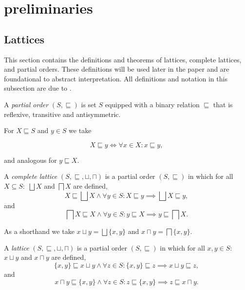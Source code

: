 
\section{preliminaries}\label{sec:preliminaries}

\subsection{Lattices}\label{subsec:lattices}
This section contains the definitions and theorems of lattices, complete lattices, and partial orders.
These definitions will be used later in the paper and are foundational to abstract interpretation.
All definitions and notation in this subsection are due to \cite{nielson_formal_2019}.

\begin{definition}
    A \emph{partial order} $(S, \sqsubseteq)$ is set $S$ equipped with a binary relation $\sqsubseteq$ that is reflexive, transitive and antisymmetric.
\end{definition}


For $X \sqsubseteq S$ and $y \in S$ we take


\begin{equation}
    X \sqsubseteq y \iff \forall x \in X : x \sqsubseteq y,
\end{equation}


and analogous for $y \sqsubseteq X$.


\begin{definition}
    A \emph{complete lattice} $(S, \sqsubseteq, \sqcup, \sqcap)$ is a partial order $(S, \sqsubseteq)$ in which for all $X \subseteq S:$ $\bigsqcup X$ and $\bigsqcap X$ are defined,
        \begin{equation}
            X \sqsubseteq \bigsqcup X \land \forall y \in S : X \sqsubseteq y \implies \bigsqcup X \sqsubseteq y,
        \end{equation}
        and
        \begin{equation}
            \bigsqcap X \sqsubseteq X \land \forall y \in S : y \sqsubseteq X \implies y \sqsubseteq \bigsqcap X.
        \end{equation}
\end{definition}


As a shorthand we take $x \sqcup y = \bigsqcup \{x, y\}$ and $x \sqcap y = \bigsqcap \{x, y\}$.


\begin{definition}
    A \emph{lattice} $(S, \sqsubseteq, \sqcup, \sqcap)$ is a partial order $(S, \sqsubseteq)$ in which for all $x,y \in S:$ $x \sqcup y$ and $x \sqcap y$ are defined,
        \begin{equation}
            \{x, y\} \sqsubseteq x \sqcup y \land \forall z \in S : \{x, y\} \sqsubseteq z \implies x \sqcup y \sqsubseteq z,
        \end{equation}
        and
        \begin{equation}
            x \sqcap y \sqsubseteq \{x, y\} \land \forall z \in S : z \sqsubseteq \{x, y\} \implies z \sqsubseteq x \sqcap y.
        \end{equation}
\end{definition}


